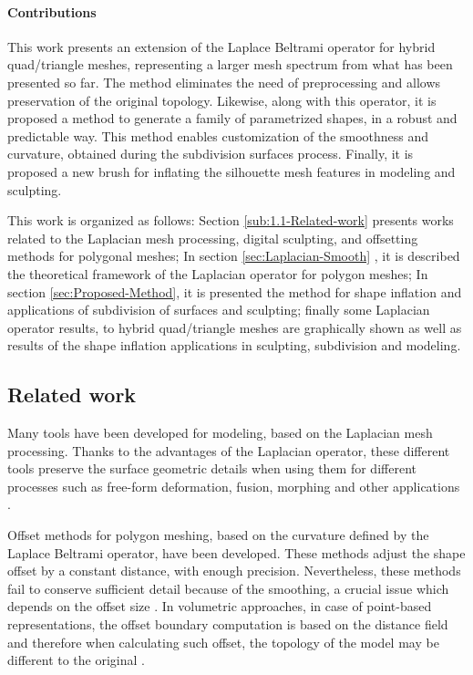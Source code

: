 \documentclass[10pt, conference]{IEEEtran}
\begin{document}
\paragraph*{Contributions}
%
This work presents an extension of the Laplace
Beltrami operator for hybrid quad/triangle meshes, representing a
larger mesh spectrum from what has been presented so far. The method
eliminates the need of preprocessing and allows preservation of the
original topology. Likewise, along with this operator, it is proposed
a method to generate a family of parametrized shapes, in a robust
and predictable way. This method enables customization of the smoothness
and curvature, obtained during the subdivision surfaces process. Finally,
it is proposed a new brush for inflating the silhouette mesh features
in modeling and sculpting.

This work is organized as follows: Section \ref{sub:1.1-Related-work}
presents works related to the Laplacian mesh processing, digital sculpting,
and offsetting methods for polygonal meshes; In section \ref{sec:Laplacian-Smooth}
, it is described the theoretical framework of the Laplacian operator
for polygon meshes; In section \ref{sec:Proposed-Method}, it is presented
the method for shape inflation and applications of subdivision of
surfaces and sculpting; finally some Laplacian operator results, to
hybrid quad/triangle meshes are graphically shown as well as results
of the shape inflation applications in sculpting, subdivision and
modeling.


\subsection{Related work\label{sub:1.1-Related-work}}
%
Many tools have been developed for modeling, based on the Laplacian
mesh processing. Thanks to the advantages of the Laplacian operator,
these different tools preserve the surface geometric details when
using them for different processes such as free-form deformation,
fusion, morphing and other applications \cite{Sorkine2004}. 

Offset methods for polygon meshing, based on the curvature defined
by the Laplace Beltrami operator, have been developed. These methods
adjust the shape offset by a constant distance, with enough precision. Nevertheless, these methods fail
to conserve sufficient detail because of the smoothing, a crucial
issue which depends on the offset size \cite{Zhuo2012}. In volumetric
approaches, in case of point-based representations, the offset boundary
computation is based on the distance field and therefore when calculating
such offset, the topology of the model may be different to the original
\cite{Chen2011}.
\end{document}
